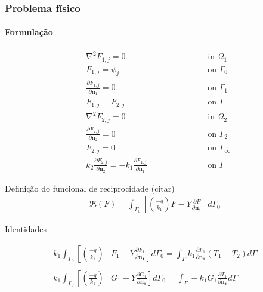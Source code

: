 \documentclass{beamer}
\begin{document}
\begin{frame}
	\frametitle{Problema físico}
	\framesubtitle{Formulação}
	\begin{subequations}
		\begin{alignat}{2}
		& \nabla^2 F_{1,j} = 0 \quad\quad\quad\quad\quad && \text{ in } \Omega_1 \label{funcao_F_harm_T1} \\
		& F_{1,j} = \psi_j && \text{ on } \Gamma_0  \label{funcao_F_cc_T1_2} \\
		& \frac{\partial F_{1,j}}{\partial \mathbf{n}_1} = 0 && \text{ on }  \Gamma_1 \label{funcao_F_cc_T1_1} \\ 
		& F_{1,j} = F_{2, j} \quad\quad\quad\quad\quad\quad\quad\quad && \text{ on }  \Gamma \label{funcao_F_cc_grad_T1} \\
		& \nabla^2 F_{2,j} = 0 && \text{ in }  \Omega_2 \label{funcao_F_harm_T2} \\
		& \frac{\partial F_{2,j}}{\partial \mathbf{n}_2} = 0 && \text{ on }  \Gamma_2 \label{funcao_F_cc_T1_3} \\
		& F_{2,j} = 0 && \text{ on }  \Gamma_\infty \label{funcao_F_cc_T1_4} \\
		& k_2\frac{\partial F_{2, j}}{\partial\mathbf{n}_2} = - k_1\frac{\partial F_{1,j}}{\partial\mathbf{n}_1} && \text{ on }  \Gamma \label{funcao_F_cc_T1_5}
		\end{alignat}
	\end{subequations}
\end{frame}

\begin{frame}
	Definição do funcional de reciprocidade (citar)
	\begin{align}
	\Re(F) = \int_{\Gamma_0}\left[\left(\frac{-q}{k_1}\right)F - Y\frac{\partial F}{\partial\mathbf{n_1}}\right]d\Gamma_0
	\label{def_funcional_reciprocidade}
	\end{align}
\end{frame}

\begin{frame}
	Identidades
	
	\begin{align}
	k_1\int_{\Gamma_0}\left[\left(\frac{-q}{k_1}\right)\right. & \left.F_1 - Y\frac{\partial F_1}{\partial\mathbf{n_1}}\right]d\Gamma_0
	=\int_\Gamma k_1 \frac{\partial F_1}{\partial\mathbf{n_1}}\left(T_1 - T_2\right)d\Gamma
	\label{identidade_T} \\ \nonumber \\
	k_1\int_{\Gamma_0}\left[\left(\frac{-q}{k_1}\right)\right. & \left.G_1 -  Y\frac{\partial G_1}{\partial\mathbf{n_1}}\right]d\Gamma_0
	= \int_\Gamma -k_1 G_1 \frac{\partial T_1}{\partial\mathbf{n_1}}d\Gamma
	\label{identidade_q}
	\end{align}
	
\end{frame}
\end{document}
